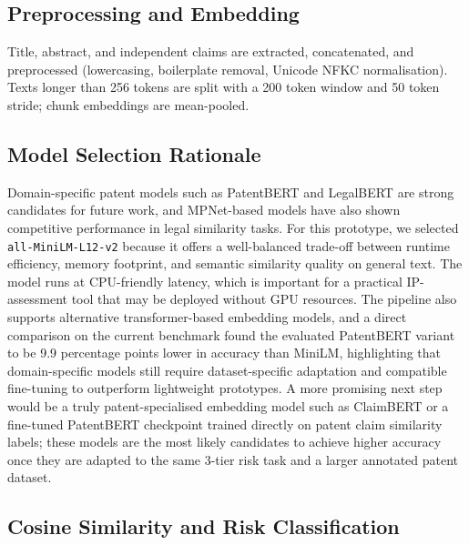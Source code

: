 \documentclass[conference]{IEEEtran}
\begin{document}
\subsection{Preprocessing and Embedding}

Title, abstract, and independent claims are extracted, concatenated, and preprocessed (lowercasing, boilerplate removal, Unicode NFKC normalisation).
Texts longer than 256 tokens are split with a 200 token window and 50 token stride; chunk embeddings are mean-pooled.

\subsection{Model Selection Rationale}

Domain-specific patent models such as PatentBERT and LegalBERT are strong candidates for future work, and MPNet-based models have also shown competitive performance in legal similarity tasks. For this prototype, we selected \texttt{all-MiniLM-L12-v2} because it offers a well-balanced trade-off between runtime efficiency, memory footprint, and semantic similarity quality on general text.
The model runs at CPU-friendly latency, which is important for a practical IP-assessment tool that may be deployed without GPU resources.
The pipeline also supports alternative transformer-based embedding models, and a direct comparison on the current benchmark found the evaluated PatentBERT variant to be 9.9 percentage points lower in accuracy than MiniLM, highlighting that domain-specific models still require dataset-specific adaptation and compatible fine-tuning to outperform lightweight prototypes.
A more promising next step would be a truly patent-specialised embedding model such as ClaimBERT or a fine-tuned PatentBERT checkpoint trained directly on patent claim similarity labels; these models are the most likely candidates to achieve higher accuracy once they are adapted to the same 3-tier risk task and a larger annotated patent dataset.

\subsection{Cosine Similarity and Risk Classification}
\end{document}
